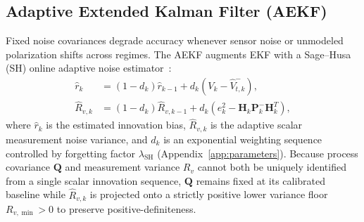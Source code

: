 \documentclass[11pt,a4paper]{article}
\begin{document}
\subsection{Adaptive Extended Kalman Filter (AEKF)}
Fixed noise covariances degrade accuracy whenever sensor noise or unmodeled polarization shifts across regimes. The AEKF augments EKF with a Sage--Husa (SH) online adaptive noise estimator~\cite{Xiang2022aekf}:
\begin{align}
\hat{r}_k &= (1 - d_k)\hat{r}_{k-1} + d_k \left( V_k - \hat{V}_{t,k}^- \right), \label{eqn:sh_mean}\\
\hat{R}_{v,k} &= (1 - d_k)\hat{R}_{v,k-1} + d_k \left( e_k^2 - \mathbf{H}_k \mathbf{P}_k^- \mathbf{H}_k^T \right), \label{eqn:sh_meas_cov}
\end{align}
where $\hat{r}_k$ is the estimated innovation bias, $\hat{R}_{v,k}$ is the adaptive scalar measurement noise variance, and $d_k$ is an exponential weighting sequence controlled by forgetting factor $\lambda_{\text{SH}}$ (Appendix~\ref{app:parameters}). Because process covariance $\mathbf{Q}$ and measurement variance $R_v$ cannot both be uniquely identified from a single scalar innovation sequence, $\mathbf{Q}$ remains fixed at its calibrated baseline while $\hat{R}_{v,k}$ is projected onto a strictly positive lower variance floor $R_{v,\min} > 0$ to preserve positive-definiteness.
\end{document}
